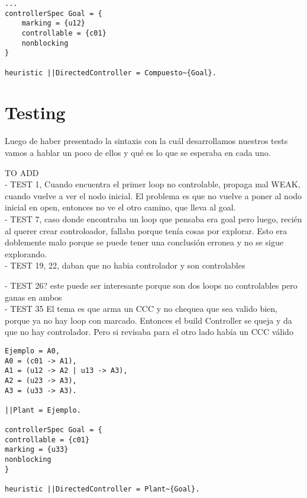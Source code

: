 \begin{lstlisting}[language = mtsa, caption=Ejemplo de Controller y DCS, label=ejController]
...
controllerSpec Goal = {
    marking = {u12}
    controllable = {c01}
    nonblocking
}

heuristic ||DirectedController = Compuesto~{Goal}.
\end{lstlisting}


\section{Testing}
Luego de haber presentado la sintaxis con la cuál desarrollamos nuestros tests vamos a hablar un poco de ellos y qué es lo que se esperaba en cada uno. 


TO ADD\\

- TEST 1, Cuando encuentra el primer loop no controlable, propaga mal WEAK, cuando vuelve a ver el nodo inicial. El problema es que no vuelve a poner al nodo inicial en open, entonces no ve el otro camino, que lleva al goal.\\

- TEST 7, caso donde encontraba un loop que pensaba era goal pero luego, recién al querer crear controloador, fallaba porque tenía cosas por explorar. Esto era doblemente malo porque se puede tener una conclusión erronea y no se sigue explorando.\\

- TEST 19, 22, daban que no habia controlador y son controlables

- TEST 26? este puede ser interesante porque son dos loops no controlables pero ganas en ambos\\

- TEST 35 El tema es que arma un CCC y no chequea que sea valido bien, porque ya no hay loop con marcado. Entonces el build Controller se queja y da que no hay controlador. Pero si revisaba para el otro lado había un CCC válido

\begin{lstlisting}[language = mtsa, caption=Ejemplo de test]
Ejemplo = A0,
A0 = (c01 -> A1),
A1 = (u12 -> A2 | u13 -> A3),
A2 = (u23 -> A3),
A3 = (u33 -> A3).

||Plant = Ejemplo.

controllerSpec Goal = {
controllable = {c01}
marking = {u33}
nonblocking
}

heuristic ||DirectedController = Plant~{Goal}.
\end{lstlisting}
